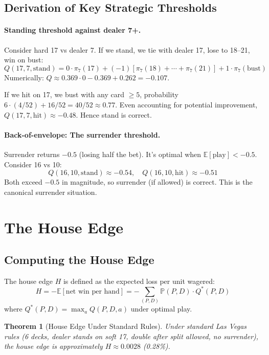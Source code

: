 \documentclass[11pt,a4paper]{article}
\newtheorem{theorem}{Theorem}[section]
\theoremstyle{definition}
\newcommand{\E}{\mathbb{E}}
\newcommand{\Prob}{\mathbb{P}}
\begin{document}
\subsection{Derivation of Key Strategic Thresholds}

\paragraph{Standing threshold against dealer 7+.} Consider hard 17 vs dealer 7. If we stand, we tie with dealer 17, lose to 18--21, win on bust:
\[
Q(17, 7, \text{stand}) = 0 \cdot \pi_7(17) + (-1)[\pi_7(18) + \cdots + \pi_7(21)] + 1 \cdot \pi_7(\text{bust})
\]
Numerically: $Q \approx 0.369 \cdot 0 - 0.369 + 0.262 = -0.107$.

If we hit on 17, we bust with any card $\geq 5$, probability $6 \cdot (4/52) + 16/52 = 40/52 \approx 0.77$. Even accounting for potential improvement, $Q(17, 7, \text{hit}) \approx -0.48$. Hence stand is correct.

\paragraph{Back-of-envelope: The surrender threshold.} Surrender returns $-0.5$ (losing half the bet). It's optimal when $\E[\text{play}] < -0.5$. Consider 16 vs 10:
\[
Q(16, 10, \text{stand}) \approx -0.54, \quad Q(16, 10, \text{hit}) \approx -0.51
\]
Both exceed $-0.5$ in magnitude, so surrender (if allowed) is correct. This is the canonical surrender situation.

\section{The House Edge}

\subsection{Computing the House Edge}

The house edge $H$ is defined as the expected loss per unit wagered:
\begin{equation}
H = -\E[\text{net win per hand}] = -\sum_{(P,D)} \Prob(P, D) \cdot Q^*(P, D)
\end{equation}
where $Q^*(P,D) = \max_a Q(P, D, a)$ under optimal play.

\begin{theorem}[House Edge Under Standard Rules]
Under standard Las Vegas rules (6 decks, dealer stands on soft 17, double after split allowed, no surrender), the house edge is approximately $H \approx 0.0028$ (0.28\%).
\end{theorem}
\end{document}
